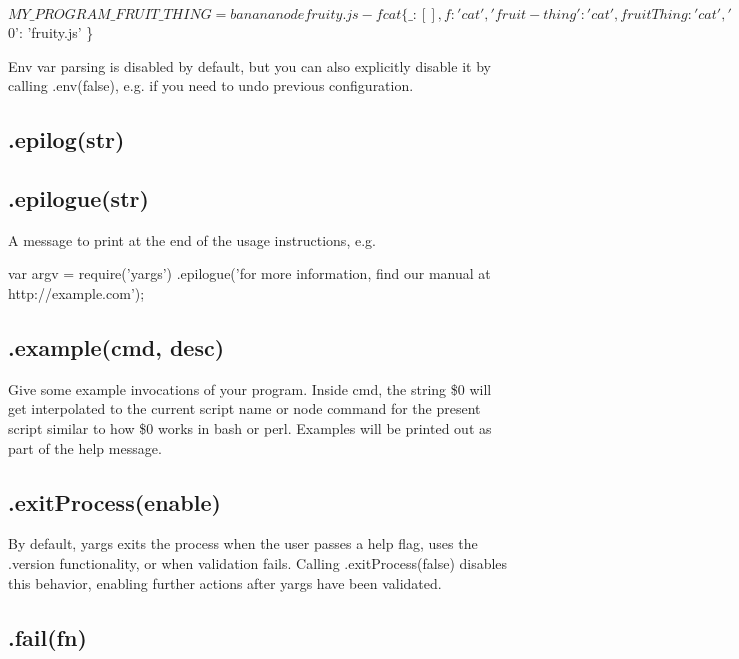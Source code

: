 \begin{DoxyCode}
$ MY\_PROGRAM\_FRUIT\_THING=banana node fruity.js -f cat
\{ \_: [],
  f: 'cat',
  'fruit-thing': 'cat',
  fruitThing: 'cat',
  '$0': 'fruity.js' \}
\end{DoxyCode}


Env var parsing is disabled by default, but you can also explicitly disable it by calling {\ttfamily .env(false)}, e.\+g. if you need to undo previous configuration.

\subsection*{.epilog(str) }

\subsection*{.epilogue(str) }

A message to print at the end of the usage instructions, e.\+g.


\begin{DoxyCode}
var argv = require('yargs')
  .epilogue('for more information, find our manual at http://example.com');
\end{DoxyCode}


\subsection*{.example(cmd, desc) }

Give some example invocations of your program. Inside {\ttfamily cmd}, the string {\ttfamily \$0} will get interpolated to the current script name or node command for the present script similar to how {\ttfamily \$0} works in bash or perl. Examples will be printed out as part of the help message.

\subsection*{\label{_exitprocess}%
.exit\+Process(enable) }

By default, yargs exits the process when the user passes a help flag, uses the {\ttfamily .version} functionality, or when validation fails. Calling {\ttfamily .exit\+Process(false)} disables this behavior, enabling further actions after yargs have been validated.

\subsection*{\label{_fail}%
.fail(fn) }


